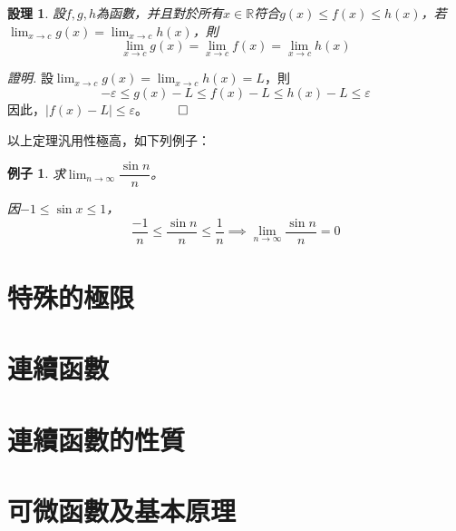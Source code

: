 \documentclass[12pt]{article}
\newtheorem*{proposition}{設理}
\newtheorem*{example}{例子}
\renewenvironment*{proof}{\textit{證明.}}{\hfill$\qed$}
\begin{document}
    \begin{proposition}
        設$f,g,h$為函數，并且對於所有$x\in\mathbb{R}$符合$g(x)\leq f(x)\leq h(x)$，若$\displaystyle \lim_{x\to c}g(x)=\lim_{x\to c}h(x)$，則$$\lim_{x\to c}g(x)=\lim_{x\to c}f(x)=\lim_{x\to c}h(x)$$
    \end{proposition}

    \begin{proof}
        設$\displaystyle \lim_{x\to c}g(x)=\lim_{x\to c}h(x)=L$，則$$-\varepsilon\leq g(x)-L\leq f(x)-L\leq h(x)-L\leq \varepsilon$$
        因此，$|f(x)-L|\leq \varepsilon$。
    \end{proof}

    以上定理汎用性極高，如下列例子：
    
    \begin{example}
        求$\lim_{n\to \infty}\dfrac{\sin{n}}{n}$。

        因$-1\leq \sin{x}\leq 1$，$$\frac{-1}{n}\leq \frac{\sin{n}}{n}\leq \frac{1}{n}\implies \lim_{n\to\infty}\frac{\sin{n}}{n}=0$$
    \end{example}
    \section*{特殊的極限}
    \section*{連續函數}
    \section*{連續函數的性質}
    \section*{可微函數及基本原理}
\end{document}

